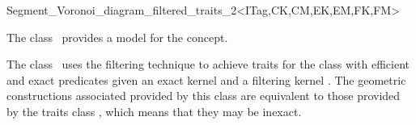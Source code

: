 


\begin{ccRefClass}
{Segment_Voronoi_diagram_filtered_traits_2<ITag,CK,CM,EK,EM,FK,FM>}


\ccDefinition
  
The class \ccRefName\ provides a model for the
 concept.

The class \ccRefName\ uses the filtering technique \cite{bbp-iayed-01}
to achieve traits for the 
class with efficient and exact predicates given an exact
kernel  and a filtering kernel . The geometric
constructions associated provided by this class are equivalent
to those provided by the traits class
, which means that
they may be inexact.


\end{ccRefClass}
